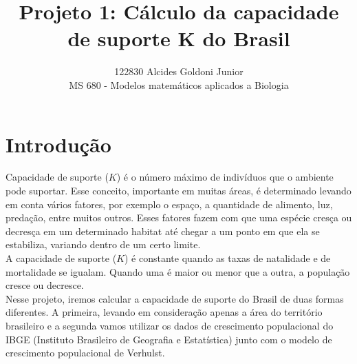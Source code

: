 \documentclass[a4paper]{article}
\title{Projeto 1: C\'{a}lculo da capacidade de suporte {K} do Brasil }
\author{122830 Alcides Goldoni Junior\\
  \small MS 680 - Modelos matem\'{a}ticos aplicados a Biologia\\
}%
\begin{document}
\maketitle
\abstract{}
\section{Introdu\c{c}\~{a}o}
Capacidade de suporte ($K$) \'{e} o n\'{u}mero m\'{a}ximo de indiv\'{i}duos que o ambiente pode suportar. Esse conceito, importante em muitas \'{a}reas, \'{e} determinado levando em conta v\'{a}rios fatores, por exemplo o espa\c{c}o, a quantidade de alimento, luz, preda\c{c}\~{a}o, entre muitos outros. Esses fatores fazem com que uma esp\'{e}cie cres\c{c}a ou decres\c{c}a em um determinado habitat at\'{e} chegar a um ponto em que ela se estabiliza, variando dentro de um certo limite.
\\
A capacidade de suporte ($K$) \'{e} constante quando as taxas de natalidade e de mortalidade se igualam. Quando uma \'{e} maior ou menor que a outra, a popula\c{c}\~{a}o cresce ou decresce.
\\
Nesse projeto, iremos calcular a capacidade de suporte do Brasil de duas formas diferentes. A primeira, levando em considera\c{c}\~{a}o apenas a \'{a}rea do territ\'{o}rio brasileiro e a segunda vamos utilizar os dados de crescimento populacional do IBGE (Instituto Brasileiro de Geografia e Estat\'{i}stica) junto com o modelo de crescimento populacional de Verhulst.
\\
\end{document}
